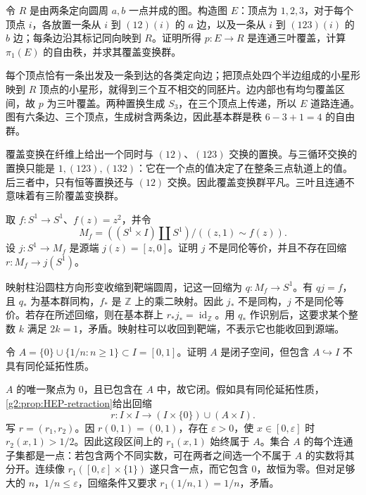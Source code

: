 \begin{exercise}\label{g2:ex:three-sheet-graph-cover}
	令 \(R\) 是由两条定向圆周 \(a,b\) 一点并成的图。构造图 \(E\)：顶点为 \(1,2,3\)，对于每个顶点 \(i\)，各放置一条从 \(i\) 到 \((12)(i)\) 的 \(a\) 边，以及一条从 \(i\) 到 \((123)(i)\) 的 \(b\) 边；每条边沿其标记同向映到 \(R\)。证明所得 \(p:E\to R\) 是连通三叶覆盖，计算 \(\pi_1(E)\) 的自由秩，并求其覆盖变换群。
\end{exercise}
\begin{solution}
	每个顶点恰有一条出发及一条到达的各类定向边；把顶点处四个半边组成的小星形映到 \(R\) 顶点的小星形，就得到三个互不相交的同胚片。边内部也有均匀覆盖区间，故 \(p\) 为三叶覆盖。两种置换生成 \(S_3\)，在三个顶点上传递，所以 \(E\) 道路连通。图有六条边、三个顶点，生成树含两条边，因此基本群是秩 \(6-3+1=4\) 的自由群。

	覆盖变换在纤维上给出一个同时与 \((12)\)、\((123)\) 交换的置换。与三循环交换的置换只能是 \(1,(123),(132)\)：它在一个点的值决定了在整条三点轨道上的值。后三者中，只有恒等置换还与 \((12)\) 交换。因此覆盖变换群平凡。三叶且连通不意味着有三阶覆盖变换群。
\end{solution}

\begin{exercise}\label{g2:ex:mapping-cylinder-no-retract}
	取 \(f:S^1\to S^1\)、\(f(z)=z^2\)，并令
	\[
		M_f=((S^1\times I)\amalg S^1)/((z,1)\sim f(z)).
	\]
	设 \(j:S^1\to M_f\) 是源端 \(j(z)=[z,0]\)。证明 \(j\) 不是同伦等价，并且不存在回缩 \(r:M_f\to j(S^1)\)。
\end{exercise}
\begin{solution}
	映射柱沿圆柱方向形变收缩到靶端圆周，记这一回缩为 \(q:M_f\to S^1\)。有 \(qj=f\)，且 \(q_*\) 为基本群同构，\(f_*\) 是 \(\mathbb Z\) 上的乘二映射。因此 \(j_*\) 不是同构，\(j\) 不是同伦等价。若存在所述回缩，则在基本群上 \(r_*j_*=\operatorname{id}_{\mathbb Z}\)。用 \(q_*\) 作识别后，这要求某个整数 \(k\) 满足 \(2k=1\)，矛盾。映射柱可以收回到靶端，不表示它也能收回到源端。
\end{solution}

\begin{exercise}\label{g2:ex:closed-not-cofibration}
	令 \(A=\{0\}\cup\{1/n:n\ge1\}\subset I=[0,1]\)。证明 \(A\) 是闭子空间，但包含 \(A\hookrightarrow I\) 不具有同伦延拓性质。
\end{exercise}
\begin{solution}
	\(A\) 的唯一聚点为 \(0\)，且已包含在 \(A\) 中，故它闭。假如具有同伦延拓性质，\cref{g2:prop:HEP-retraction}给出回缩
	\[
		r:I\times I\longrightarrow (I\times\{0\})\cup(A\times I).
	\]
	写 \(r=(r_1,r_2)\)。因 \(r(0,1)=(0,1)\)，存在 \(\varepsilon>0\)，使 \(x\in[0,\varepsilon]\) 时 \(r_2(x,1)>1/2\)。因此这段区间上的 \(r_1(x,1)\) 始终属于 \(A\)。集合 \(A\) 的每个连通子集都是一点：若包含两个不同实数，可在两者之间选一个不属于 \(A\) 的实数将其分开。连续像 \(r_1([0,\varepsilon]\times\{1\})\) 遂只含一点，而它包含 \(0\)，故恒为零。但对足够大的 \(n\)，\(1/n\le\varepsilon\)，回缩条件又要求 \(r_1(1/n,1)=1/n\)，矛盾。
\end{solution}


